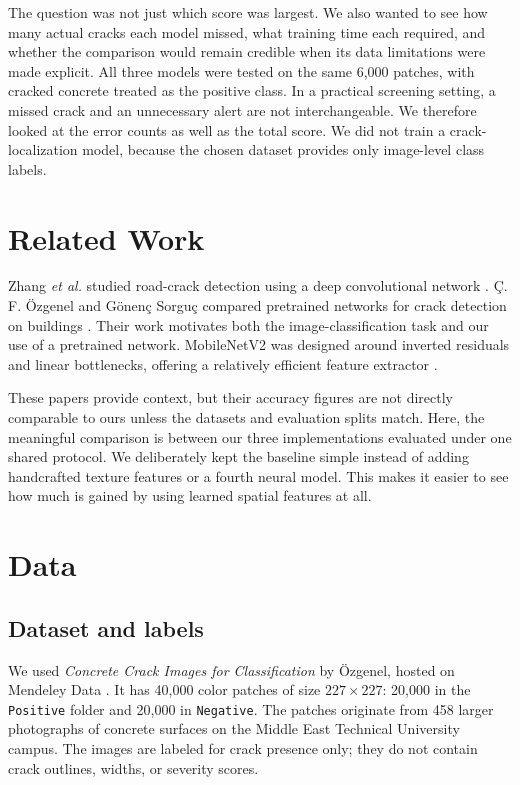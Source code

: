 \documentclass[conference,letterpaper]{IEEEtran}
\begin{document}
The question was not just which score was largest. We also wanted to see how many actual cracks each model missed, what training time each required, and whether the comparison would remain credible when its data limitations were made explicit. All three models were tested on the same 6,000 patches, with cracked concrete treated as the positive class. In a practical screening setting, a missed crack and an unnecessary alert are not interchangeable. We therefore looked at the error counts as well as the total score. We did not train a crack-localization model, because the chosen dataset provides only image-level class labels.

\section{Related Work}
Zhang \emph{et al.} studied road-crack detection using a deep convolutional network \cite{zhang2016}. \c{C}. F. \"Ozgenel and G\"onen\c{c} Sorgu\c{c} compared pretrained networks for crack detection on buildings \cite{ozgenel2018paper}. Their work motivates both the image-classification task and our use of a pretrained network. MobileNetV2 was designed around inverted residuals and linear bottlenecks, offering a relatively efficient feature extractor \cite{sandler2018}.

These papers provide context, but their accuracy figures are not directly comparable to ours unless the datasets and evaluation splits match. Here, the meaningful comparison is between our three implementations evaluated under one shared protocol. We deliberately kept the baseline simple instead of adding handcrafted texture features or a fourth neural model. This makes it easier to see how much is gained by using learned spatial features at all.

\section{Data}
\subsection{Dataset and labels}
We used \emph{Concrete Crack Images for Classification} by \"Ozgenel, hosted on Mendeley Data \cite{ozgenel2018data}. It has 40,000 color patches of size $227\times227$: 20,000 in the \texttt{Positive} folder and 20,000 in \texttt{Negative}. The patches originate from 458 larger photographs of concrete surfaces on the Middle East Technical University campus. The images are labeled for crack presence only; they do not contain crack outlines, widths, or severity scores.
\end{document}

